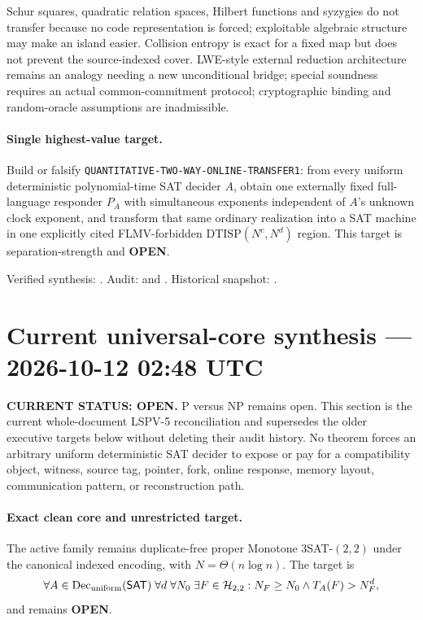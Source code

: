 \documentclass[11pt]{article}
\newcommand{\statusopen}{\textcolor{openstatus}{\textbf{OPEN}}}
\begin{document}
Schur squares, quadratic relation spaces, Hilbert functions and syzygies do
not transfer because no code representation is forced; exploitable algebraic
structure may make an island easier.  Collision entropy is exact for a fixed
map but does not prevent the source-indexed cover.  LWE-style external
reduction architecture remains an analogy needing a new unconditional bridge;
special soundness requires an actual common-commitment protocol; cryptographic
binding and random-oracle assumptions are inadmissible.

\paragraph{Single highest-value target.}
Build or falsify \texttt{QUANTITATIVE-TWO-WAY-ONLINE-TRANSFER1}: from every
uniform deterministic polynomial-time SAT decider \(A\), obtain one
externally fixed full-language responder \(P_A\) with simultaneous exponents
independent of \(A\)'s unknown clock exponent, and transform that same
ordinary realization into a SAT machine in one explicitly cited
FLMV-forbidden \(\mathrm{DTISP}(N^c,N^d)\) region.  This target is
separation-strength and \statusopen.

Verified synthesis:
.
Audit:
 and
.
Historical snapshot:
.

\clearpage

\section{Current universal-core synthesis --- 2026-10-12 02:48 UTC}

\begin{statusbox}
\textbf{CURRENT STATUS: OPEN.} P versus NP remains open.  This section is the
current whole-document LSPV-5 reconciliation and supersedes the older
executive targets below without deleting their audit history.  No theorem
forces an arbitrary uniform deterministic SAT decider to expose or pay for a
compatibility object, witness, source tag, pointer, fork, online response,
memory layout, communication pattern, or reconstruction path.
\end{statusbox}

\paragraph{Exact clean core and unrestricted target.}
The active family remains duplicate-free proper Monotone $3$SAT-$(2,2)$ under
the canonical indexed encoding, with $N=\Theta(n\log n)$.  The target is
\[
 \forall A\in\operatorname{Dec}_{\rm uniform}(\mathsf{SAT})\;
 \forall d\;\forall N_0\;\exists F\in\mathcal H_{2,2}:
 N_F\ge N_0\land T_A(F)>N_F^d,
\]
and remains \statusopen.
\end{document}
